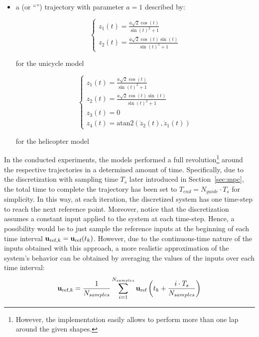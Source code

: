 \documentclass[../main.tex]{subfiles}
\begin{document}
\begin{itemize}
	\item a  (or ``'') trajectory with
		parameter $a = 1$ described by:
		\vspace{-0.1cm}
		\begin{multicols}{2}
			\begin{equation*}
				\begin{cases}
					z_1(t) = \frac{a \sqrt{2} \cos(t)}{\sin(t)^2 + 1}\\
					z_2(t) = \frac{a \sqrt{2} \cos(t) \sin(t)}{\sin(t)^2 + 1}
				\end{cases}
			\end{equation*}
			\begin{center}
				for the unicycle model\\
			\end{center}
		\columnbreak
			\begin{equation*}
				\begin{cases}
					z_1(t) = \frac{a \sqrt{2} \cos(t)}{\sin(t)^2 + 1}\\
					z_2(t) = \frac{a \sqrt{2} \cos(t) \sin(t)}{\sin(t)^2 + 1}\\
					z_3(t) = 0\\
					z_4(t) = \text{atan2}\left(\dot{z}_2(t), \dot{z}_1(t)\right)
				\end{cases}
			\end{equation*}
			\begin{center}
				for the helicopter model
			\end{center}
		\end{multicols}

\end{itemize}

In the conducted experiments, the models performed a full
revolution\footnote{However, the implementation easily allows to perform more than one
lap around the given shapes.} around the respective trajectories in a determined amount of
time.
Specifically, due to the discretization with sampling time $T_s$ later introduced in Section~\ref{sec:mpc}, the total time to complete the
trajectory has been set to
$T_{end} = N_{guide} \cdot T_s$ for simplicity. In this way, at each iteration,
the discretized system has one time-step to reach the next reference point.
Moreover, notice that the discretization assumes a constant input applied to
the system at each time-step. Hence, a possibility would be to just sample the
reference inputs at the beginning of each time interval $\mathbf{u}_{\text{ref}, k} =
\mathbf{u}_{\text{ref}}(t_k)$. However, due to the continuous-time nature of the 
inputs obtained with this approach, a more realistic approximation of the
system's behavior can be obtained by averaging the values of the inputs over
each time interval:
\begin{equation*}
	\mathbf{u}_{\text{ref}, k} = \frac{1}{N_{samples}} \sum_{i=1}^{N_{samples}}
	\mathbf{u}_{\text{ref}}\left(t_k + \frac{i
	\cdot T_s}{N_{samples}} \right)
\end{equation*}
\end{document}
